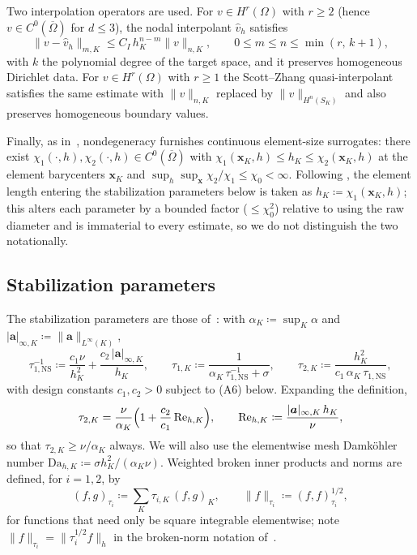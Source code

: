 \documentclass[11pt]{article}
\theoremstyle{remark}
\newcommand{\ba}{\boldsymbol{a}}
\newcommand{\norm}[1]{\lVert #1 \rVert}
\newcommand{\tns}{\tau_{1,\mathrm{NS}}}
\newcommand{\Dah}{\mathrm{Da}_{h,K}}
\newcommand{\Reh}{\mathrm{Re}_{h,K}}
\begin{document}
Two interpolation operators are used. For $v \in H^{r}(\Omega)$ with $r \ge 2$ (hence
$v \in C^0(\overline\Omega)$ for $d \le 3$), the nodal interpolant $\hat v_h$
satisfies
\begin{equation}
  \label{eq:NodalInterp}
  \norm{v - \hat v_h}_{m,K} \le C_I\, h_K^{n-m}\norm{v}_{n,K},
  \qquad 0 \le m \le n \le \min(r,\, k+1),
\end{equation}
with $k$ the polynomial degree of the target space, and it preserves homogeneous
Dirichlet data. For $v \in H^{r}(\Omega)$ with $r \ge 1$ the Scott--Zhang
quasi-interpolant~\cite{ScottZhang} satisfies the same estimate with $\norm{v}_{n,K}$
replaced by $\norm{v}_{H^n(S_K)}$ and also preserves homogeneous boundary values.

Finally, as in~\cite[Lemma~1]{Codina2008}, nondegeneracy furnishes continuous element-size
surrogates: there exist $\chi_1(\cdot,h), \chi_2(\cdot,h) \in C^0(\overline\Omega)$ with
$\chi_1(\boldsymbol{x}_K, h) \le h_K \le \chi_2(\boldsymbol{x}_K, h)$ at the element
barycenters $\boldsymbol{x}_K$ and
$\sup_h\sup_{\boldsymbol{x}}\chi_2/\chi_1 \le \chi_0 < \infty$. Following
\cite{Codina2008}, the element length entering the stabilization parameters below is
taken as $h_{K} \coloneqq \chi_1(\boldsymbol{x}_K, h)$; this alters each parameter by a
bounded factor ($\le \chi_0^2$) relative to using the raw diameter and is immaterial to
every estimate, so we do not distinguish the two notationally.

\subsection{Stabilization parameters}
\label{sec:parameters}

The stabilization parameters are those of~\cite{companion}: with
$\alpha_K \coloneqq \sup_K \alpha$ and
$|\ba|_{\infty,K} \coloneqq \norm{\ba}_{L^\infty(K)}$,
\begin{equation}
  \label{eq:TauDefs}
  \tns^{-1} \coloneqq \frac{c_1\nu}{h_K^2} + \frac{c_2\,|\ba|_{\infty,K}}{h_K},
  \qquad
  \tau_{1,K} \coloneqq \frac{1}{\alpha_K\,\tns^{-1} + \sigma},
  \qquad
  \tau_{2,K} \coloneqq \frac{h_K^2}{c_1\,\alpha_K\,\tns},
\end{equation}
with design constants $c_1, c_2 > 0$ subject to (A6) below. Expanding the definition,
\begin{equation}
  \label{eq:Tau2Expanded}
  \tau_{2,K}
  = \frac{\nu}{\alpha_K}\Bigl( 1 + \frac{c_2}{c_1}\,\Reh \Bigr),
  \qquad
  \Reh \coloneqq \frac{|\ba|_{\infty,K}\, h_K}{\nu},
\end{equation}
so that $\tau_{2,K} \ge \nu/\alpha_K$ always. We will also use the elementwise mesh
Damk\"ohler number $\Dah \coloneqq \sigma h_K^2/(\alpha_K\nu)$. Weighted broken inner
products and norms are defined, for $i = 1,2$, by
\begin{equation}
  \label{eq:TauInner}
  (f, g)_{\tau_i} \coloneqq \sum_K \tau_{i,K}\,(f, g)_{K},
  \qquad
  \norm{f}_{\tau_i} \coloneqq (f,f)_{\tau_i}^{1/2},
\end{equation}
for functions that need only be square integrable elementwise; note
$\norm{f}_{\tau_i} = \lVert \tau_i^{1/2} f\rVert_h$ in the broken-norm notation
of~\cite{companion}.
\end{document}
